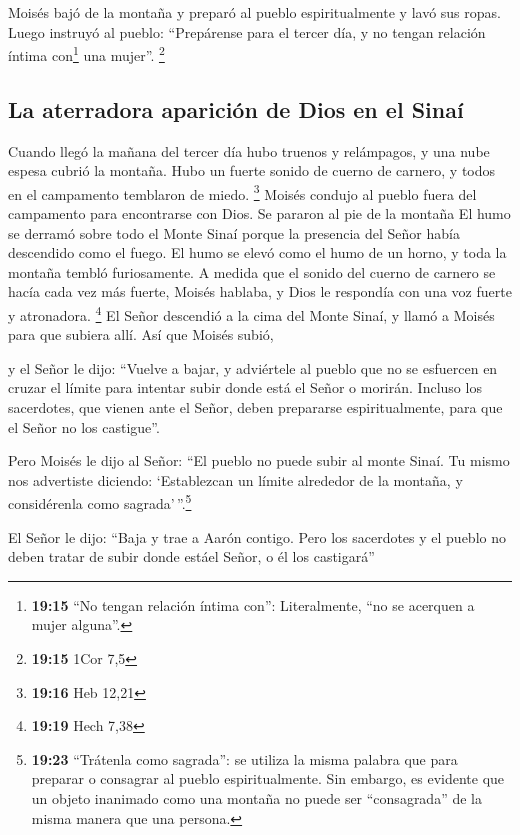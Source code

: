  Moisés bajó de la montaña y preparó al pueblo
espiritualmente y lavó sus ropas.  Luego instruyó al
pueblo: ``Prepárense para el tercer día, y no tengan relación íntima
con\footnote{\textbf{19:15} ``No tengan relación íntima con'':
  Literalmente, ``no se acerquen a mujer alguna''.} una mujer''.
\footnote{\textbf{19:15} 1Cor 7,5}

\hypertarget{la-aterradora-apariciuxf3n-de-dios-en-el-sinauxed}{%
\subsection{La aterradora aparición de Dios en el
Sinaí}\label{la-aterradora-apariciuxf3n-de-dios-en-el-sinauxed}}

 Cuando llegó la mañana del tercer día hubo truenos y
relámpagos, y una nube espesa cubrió la montaña. Hubo un fuerte sonido
de cuerno de carnero, y todos en el campamento temblaron de miedo.
\footnote{\textbf{19:16} Heb 12,21}  Moisés condujo al
pueblo fuera del campamento para encontrarse con Dios. Se pararon al pie
de la montaña  El humo se derramó sobre todo el Monte
Sinaí porque la presencia del Señor había descendido como el fuego. El
humo se elevó como el humo de un horno, y toda la montaña tembló
furiosamente.  A medida que el sonido del cuerno de
carnero se hacía cada vez más fuerte, Moisés hablaba, y Dios le
respondía con una voz fuerte y atronadora. \footnote{\textbf{19:19} Hech
  7,38}  El Señor descendió a la cima del Monte Sinaí, y
llamó a Moisés para que subiera allí. Así que Moisés subió,

 y el Señor le dijo: ``Vuelve a bajar, y adviértele al
pueblo que no se esfuercen en cruzar el límite para intentar subir donde
está el Señor o morirán.  Incluso los sacerdotes, que
vienen ante el Señor, deben prepararse espiritualmente, para que el
Señor no los castigue''.

 Pero Moisés le dijo al Señor: ``El pueblo no puede subir
al monte Sinaí. Tu mismo nos advertiste diciendo: `Establezcan un límite
alrededor de la montaña, y considérenla como sagrada'\,''.\footnote{\textbf{19:23}
  ``Trátenla como sagrada'': se utiliza la misma palabra que para
  preparar o consagrar al pueblo espiritualmente. Sin embargo, es
  evidente que un objeto inanimado como una montaña no puede ser
  ``consagrada'' de la misma manera que una persona.}

 El Señor le dijo: ``Baja y trae a Aarón contigo. Pero
los sacerdotes y el pueblo no deben tratar de subir donde estáel Señor,
o él los castigará''

